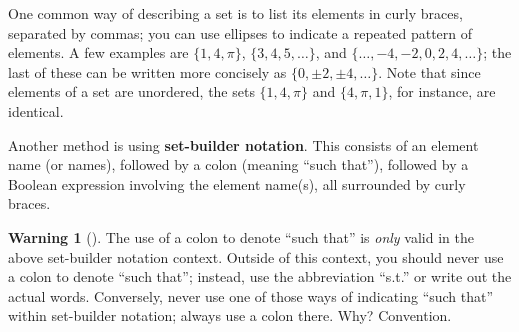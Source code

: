 \documentclass[10pt,]{book}
\newcommand{\terminology}[1]{\textbf{#1}}
\theoremstyle{plain}
\theoremstyle{definition}
\theoremstyle{definition}
\newtheorem{warning}[theorem]{Warning}
\theoremstyle{definition}
\theoremstyle{definition}
\numberwithin{equation}{section}
\begin{document}
    One common way of describing a set is to list its elements in
    curly braces, separated by commas; you can use ellipses to
    indicate a repeated pattern of elements. A few examples are
    \(\{1,4,\pi\}\), \(\{3, 4, 5, \ldots\}\), and \(\{\ldots, -4, -2, 0,
    2, 4, \ldots\}\); the last of these can be written more concisely as \(\{0,\pm 2, \pm 4,\ldots\}\). Note that since elements of a set are
    unordered, the sets \(\{1,4,\pi\}\) and \(\{4,\pi, 1\}\), for
    instance, are identical.
\par

    Another method is using \terminology{set-builder notation}. This consists of an element name (or
    names), followed by a colon (meaning ``such that''), followed by
    a Boolean expression involving the element name(s), all
    surrounded by curly braces.%
\begin{warning}[]\label{warning-1}
The use of a colon to denote ``such that'' is \emph{only} valid in the above set-builder notation context.  Outside of this context, you should never use a colon to denote ``such that''; instead, use the abbreviation ``s.t.'' or write out the actual words.   Conversely, never use one of those ways of indicating ``such that'' within set-builder notation; always use a colon there.  Why?  Convention.%
\end{warning}
\par
\end{document}
